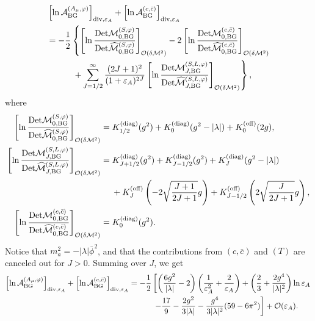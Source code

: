 \documentclass[12pt]{article}
\begin{document}
\begin{align}
  &
 \left[
  \ln\mathcal A^{(A_\mu,\varphi)}_{\rm BG}
 \right]_{{\rm div},\eps{A}}+
 \left[
  \ln\mathcal A_{\rm BG}^{(c,\bar{c})}
 \right]_{{\rm div},\eps{A}}\nonumber                                         \\
  & = -\frac{1}{2}
 \left\{
  \left[
   \ln\frac{\det \mathcal M^{(S,\varphi)}_{0,\rm BG}}{\det \widehat{\mathcal M}^{(S,\varphi)}_{0,\rm BG}}
  \right]_{\mathcal O(\delta \mathcal M^2)}-2
  \left[
   \ln\frac{\det \mathcal M^{(c,\bar{c})}_{0,\rm BG}}{\det \widehat{\mathcal M}^{(c,\bar{c})}_{0,\rm BG}}
  \right]_{\mathcal O(\delta \mathcal M^2)}\right.\nonumber                   \\
  & \hspace{7ex}\left.+\sum_{J=1/2}^{\infty}\frac{(2J+1)^2}{(1+\eps{A})^{2J}}
  \left[
   \ln\frac{\det \mathcal M^{(S,L,\varphi)}_{J,\rm BG}}{\det \widehat{\mathcal M}^{(S,L,\varphi)}_{J,\rm BG}}
  \right]_{\mathcal O(\delta \mathcal M^2)}
 \right\},
\end{align}
where
\begin{align}
 \left[
  \ln\frac{\det \mathcal M^{(S,\varphi)}_{0,\rm BG}}{\det \widehat{\mathcal M}^{(S,\varphi)}_{0,\rm BG}}
 \right]_{\mathcal O(\delta \mathcal M^2)}
  & = K_{1/2}^{\rm (diag)}(g^2)+K_{0}^{\rm (diag)}(g^2-|\lambda|)+K_0^{\rm (off)}(2g), \\
 \left[
  \ln\frac{\det \mathcal M^{(S,L,\varphi)}_{J,\rm BG}}{\det \widehat{\mathcal M}^{(S,L,\varphi)}_{J,\rm BG}}
 \right]_{\mathcal O(\delta \mathcal M^2)}
  & = K_{J+1/2}^{\rm (diag)}(g^2)+K_{J-1/2}^{\rm (diag)}(g^2)
 +K_{J}^{\rm (diag)}(g^2-|\lambda|)\nonumber                                               \\
  & \hspace{3ex}+K_J^{\rm (off)}\left(-2\sqrt{\frac{J+1}{2J+1}}g\right)
 +K_{J-1/2}^{\rm (off)}\left(2\sqrt{\frac{J}{2J+1}}g\right),                               \\
 \left[
  \ln\frac{\det \mathcal M^{(c,\bar{c})}_{0,\rm BG}}{\det \widehat{\mathcal M}^{(c,\bar{c})}_{0,\rm BG}}
 \right]_{\mathcal O(\delta \mathcal M^2)}
  & = K_{0}^{\rm (diag)}(g^2).
\end{align}
Notice that $m_a^2 = -|\lambda|\bar\phi^2$, and that the contributions
from $(c,\bar{c})$ and $(T)$ are canceled out for $J>0$.  Summing
over $J$, we get
\begin{align}
 \left[
  \ln\mathcal A^{(A_\mu,\varphi)}_{\rm BG}
 \right]_{{\rm div},\eps{A}}+
 \left[
  \ln\mathcal A_{\rm BG}^{(c,\bar{c})}
 \right]_{{\rm div},\eps{A}}
  & = -\frac{1}{2}
 \left[
  \left(
   \frac{6g^2}{|\lambda|}-2
  \right)
  \left(
   \frac{1}{\eps{A}^2}+\frac{2}{\eps{A}}
  \right)+
  \left(
   \frac{2}{3}+\frac{2g^4}{|\lambda|^2}
  \right)\ln\eps{A}\right.\nonumber                                                                 \\
  & \hspace{7ex}\left.-\frac{17}{9}-\frac{2g^2}{3|\lambda|}-\frac{g^4}{3|\lambda|^2}(59-6\pi^2)
 \right]+\mathcal O(\eps{A}).
\end{align}
\end{document}
